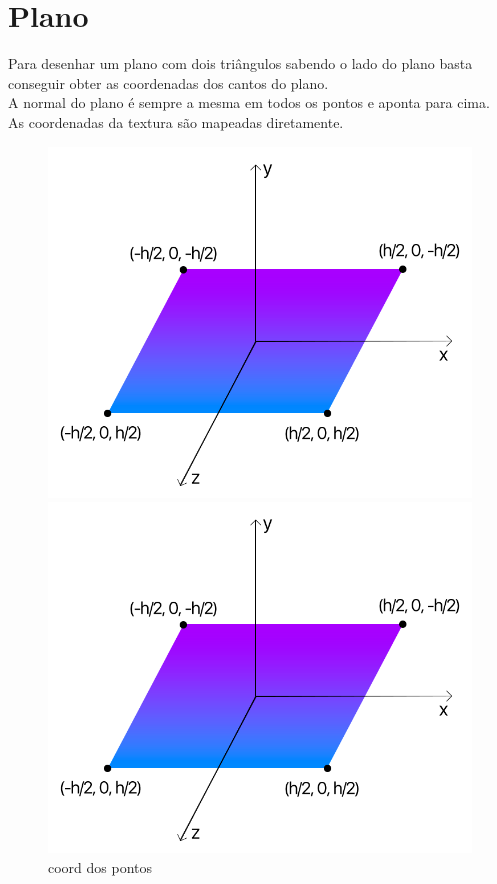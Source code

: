 \documentclass[a4paper]{report}
\begin{document}
\section{Plano}
Para desenhar um plano com dois triângulos sabendo o lado do plano basta
conseguir obter as coordenadas dos cantos do plano.\\
A normal do plano é sempre a mesma em todos os pontos e aponta para cima.\\
As coordenadas da textura são mapeadas diretamente.\\
\begin{figure}[H]
    \centering
    \begin{minipage}{0.33\textwidth}
        \centering
        \includegraphics[width=\textwidth]{images/esquema_plano.png}
        \caption{coord dos pontos}
    \end{minipage}\hfill
    \begin{minipage}{0.33\textwidth}
        \centering
        \includegraphics[width=\textwidth]{images/esquema_plano.png}

\end{minipage}
\end{figure}
\end{document}
